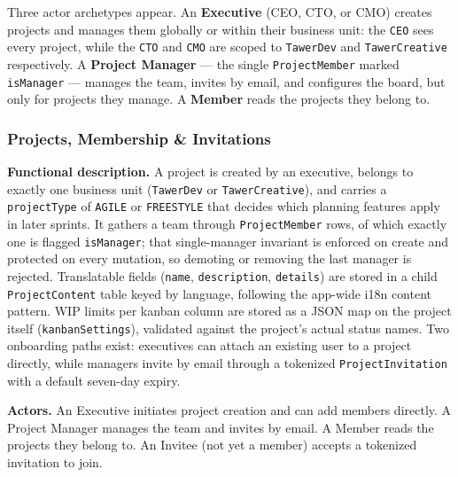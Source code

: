 Three actor archetypes appear. An \textbf{Executive} (CEO, CTO, or CMO) creates projects and
manages them globally or within their business unit: the \texttt{CEO} sees every project, while the
\texttt{CTO} and \texttt{CMO} are scoped to \texttt{TawerDev} and \texttt{TawerCreative} respectively. A
\textbf{Project Manager} --- the single \texttt{ProjectMember} marked \texttt{isManager} --- manages the team,
invites by email, and configures the board, but only for projects they manage. A \textbf{Member}
reads the projects they belong to.

\subsubsection{Projects, Membership \& Invitations}

\textbf{Functional description.} A project is created by an executive, belongs to exactly one
business unit (\texttt{TawerDev} or \texttt{TawerCreative}), and carries a \texttt{projectType} of
\texttt{AGILE} or \texttt{FREESTYLE} that decides which planning features apply in later sprints. It
gathers a team through \texttt{ProjectMember} rows, of which exactly one is flagged \texttt{isManager};
that single-manager invariant is enforced on create and protected on every mutation, so demoting
or removing the last manager is rejected. Translatable fields (\texttt{name}, \texttt{description},
\texttt{details}) are stored in a child \texttt{ProjectContent} table keyed by language, following
the app-wide i18n content pattern. WIP limits per kanban column are stored as a JSON map on the
project itself (\texttt{kanbanSettings}), validated against the project's actual status names.
Two onboarding paths exist: executives can attach an existing user to a project directly, while
managers invite by email through a tokenized \texttt{ProjectInvitation} with a default seven-day
expiry.

\textbf{Actors.} An Executive initiates project creation and can add members directly. A Project
Manager manages the team and invites by email. A Member reads the projects they belong to. An
Invitee (not yet a member) accepts a tokenized invitation to join.

